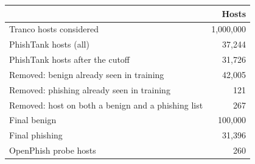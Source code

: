 \begin{tabular}{lr}
\toprule
& Hosts \\
\midrule
Tranco hosts considered & 1{,}000{,}000 \\
PhishTank hosts (all) & 37{,}244 \\
PhishTank hosts after the cutoff & 31{,}726 \\
Removed: benign already seen in training & 42{,}005 \\
Removed: phishing already seen in training & 121 \\
Removed: host on both a benign and a phishing list & 267 \\
Final benign & 100{,}000 \\
Final phishing & 31{,}396 \\
OpenPhish probe hosts & 260 \\
\bottomrule
\end{tabular}
